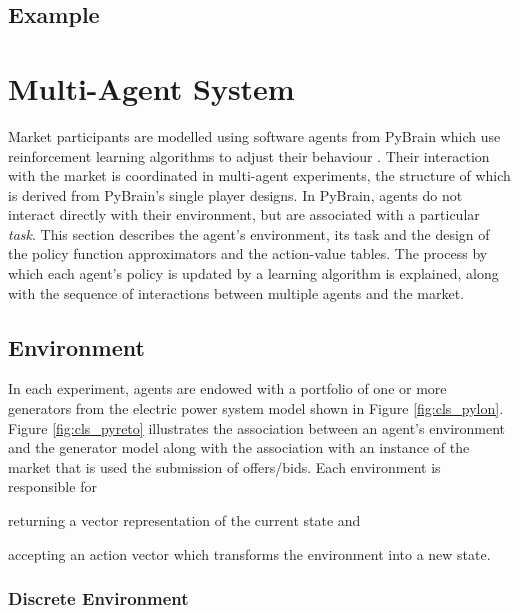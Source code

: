 \subsection{Example}

\newpage
\section{Multi-Agent System}
\label{sec:mas}
Market participants are modelled using software agents from PyBrain which use
reinforcement learning algorithms to adjust their behaviour \cite{schaul:2010}.
Their interaction with the market is coordinated in multi-agent experiments,
the structure of which is derived from PyBrain's single player designs.  In
PyBrain, agents do not interact directly with their environment, but are
associated with a particular \textit{task}.  This section describes the
agent's environment, its task and the design of the policy function
approximators and the action-value tables. The process by which each agent's
policy is updated by a learning algorithm is explained, along with the
sequence of interactions between multiple agents and the market.

\subsection{Environment}
In each experiment, agents are endowed with a portfolio of one or more
generators from the electric power system model shown in Figure
\ref{fig:cls_pylon}. Figure \ref{fig:cls_pyreto} illustrates the association
between an agent's environment and the generator model along with the
association with an instance of the market that is used the submission of
offers/bids. Each environment is responsible for \begin{inparaenum}[(i)]
\item returning a vector representation of the current state and \item
accepting an action vector which transforms the environment into a new state.
\end{inparaenum}
%

\subsubsection{Discrete Environment}

